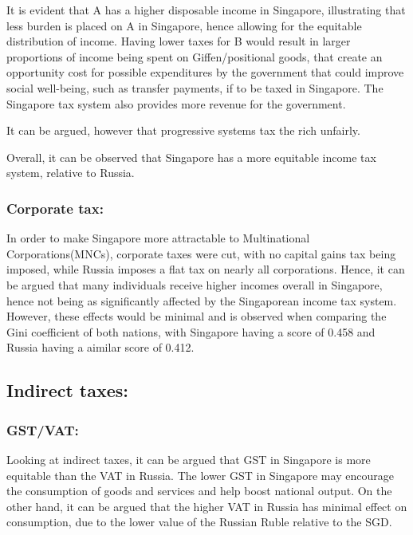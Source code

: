 \documentclass[12pt, a4paper]{article}
\begin{document}
		It is evident that A has a higher disposable income in Singapore, illustrating that less burden is placed on A in Singapore, hence allowing for the equitable distribution of income. Having lower taxes for B would result in larger proportions of income being spent on Giffen/positional goods, that create an opportunity cost for possible expenditures by the government that could improve social well-being, such as transfer payments, if to be taxed in Singapore. The Singapore tax system also provides more revenue for the government.
		\newline
		
		It can be argued, however that progressive systems tax the rich unfairly.
		\newline
		
		Overall, it can be observed that Singapore has a more equitable income tax system, relative to Russia.
		
		\subsubsection{Corporate tax:}
		
		In order to make Singapore more attractable to Multinational Corporations(MNCs), corporate taxes were cut, with no capital gains tax being imposed, while Russia imposes a flat tax on nearly all corporations. Hence, it can be argued that many individuals receive higher incomes overall in Singapore, hence not being as significantly affected by the Singaporean income tax system. However, these effects would be minimal and is observed when comparing the Gini coefficient of both nations, with Singapore having a score of 0.458 and Russia having a aimilar score of 0.412.
		
		\subsection{Indirect taxes:}
		\subsubsection{GST/VAT:}
		Looking at indirect taxes, it can be argued that GST in Singapore is more equitable than the VAT in Russia. The lower GST in Singapore may encourage the consumption of goods and services and help boost national output. On the other hand, it can be argued that the higher VAT in Russia has minimal effect on consumption, due to the lower value of the Russian Ruble relative to the SGD.
		\newline
		
\end{document}
